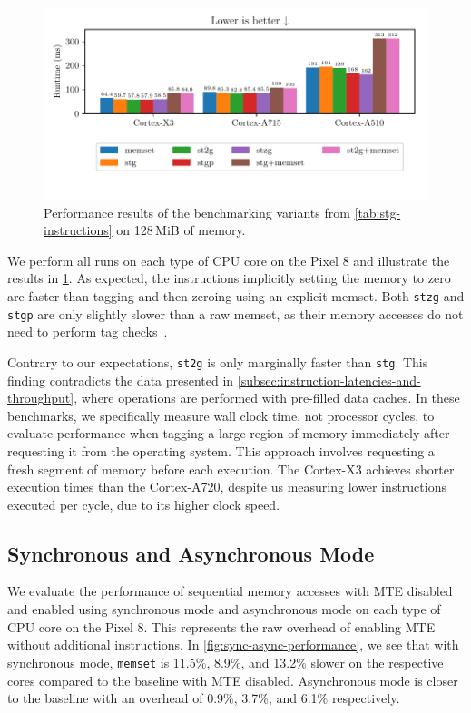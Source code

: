 \begin{figure}[h]
    \centering
    \includegraphics{plots/stg}
    \caption{Performance results of the benchmarking variants from \cref{tab:stg-instructions} on 128\,MiB of memory.}
    \label{fig:stg-performance}
\end{figure}

We perform all runs on each type of CPU core on the Pixel 8 and illustrate the results in \cref{fig:stg-performance}.
As expected, the instructions implicitly setting the memory to zero are faster than tagging and then zeroing using an explicit memset.
Both \texttt{stzg} and \texttt{stgp} are only slightly slower than a raw memset, as their memory accesses do not need to perform tag checks~\cite{ARMA2024Arch64}.

Contrary to our expectations, \texttt{st2g} is only marginally faster than \texttt{stg}.
This finding contradicts the data presented in \cref{subsec:instruction-latencies-and-throughput}, where operations are performed with pre-filled data caches.
In these benchmarks, we specifically measure wall clock time, not processor cycles, to evaluate performance when tagging a large region of memory immediately after requesting it from the operating system.
This approach involves requesting a fresh segment of memory before each execution.
The Cortex-X3 achieves shorter execution times than the Cortex-A720, despite us measuring lower instructions executed per cycle, due to its higher clock speed.

\subsection{Synchronous and Asynchronous Mode}
\label{subsec:synchronous-and-asynchronous-mode}

We evaluate the performance of sequential memory accesses with \ac{MTE} disabled and enabled using synchronous mode and asynchronous mode on each type of CPU core on the Pixel 8.
This represents the raw overhead of enabling \ac{MTE} without additional instructions.
In \cref{fig:sync-async-performance}, we see that with synchronous mode, \texttt{memset} is 11.5\%, 8.9\%, and 13.2\% slower on the respective cores compared to the baseline with \ac{MTE} disabled.
Asynchronous mode is closer to the baseline with an overhead of 0.9\%, 3.7\%, and 6.1\% respectively.

